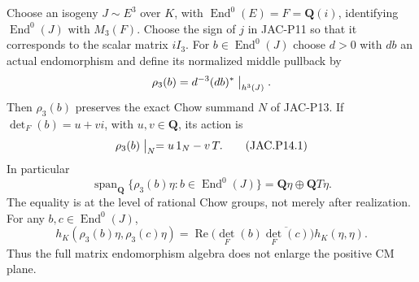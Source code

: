 \begin{proposition}[JAC-P14]\label{jac:P14}
Choose an isogeny $J\sim E^3$ over $K$, with
$\operatorname{End}^0(E)=F=\mathbf Q(i)$, identifying
$\operatorname{End}^0(J)$ with $M_3(F)$. Choose the sign of $j$
in JAC-P11 so that it corresponds to the scalar matrix $iI_3$.
For $b\in\operatorname{End}^0(J)$ choose $d>0$ with $db$ an
actual endomorphism and define its normalized middle pullback by
\[
 \rho_3(b)=d^{-3}(db)^*\bigm|_{h^3(J)}.
\]
Then $\rho_3(b)$ preserves the exact Chow summand $N$ of JAC-P13.
If $\det_F(b)=u+vi$, with $u,v\in\mathbf Q$, its action is
\[
 \rho_3(b)\bigm|_N=u\,1_N-v\,T.                       \tag{JAC.P14.1}
\]
In particular
\[
 \operatorname{span}_{\mathbf Q}
   \{\rho_3(b)\eta:b\in\operatorname{End}^0(J)\}
        =\mathbf Q\eta\oplus\mathbf Q T\eta.           \tag{JAC.P14.2}
\]
The equality is at the level of rational Chow groups, not merely
after realization. For any $b,c\in\operatorname{End}^0(J)$,
\[
 h_K(\rho_3(b)\eta,\rho_3(c)\eta)
   =\operatorname{Re}
       \bigl(\det_F(b)\overline{\det_F(c)}\bigr)
      h_K(\eta,\eta).                                \tag{JAC.P14.3}
\]
Thus the full matrix endomorphism algebra does not enlarge the
positive CM plane.
\end{proposition}

